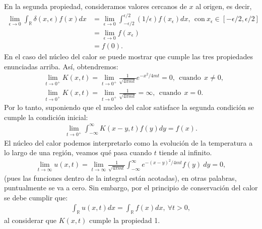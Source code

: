 \documentclass[12pt]{article}
\theoremstyle{definition}
\newcommand*{\field}[1]{\mathbb{#1}}
\begin{document}
\noindent
En la segunda propiedad, consideramos valores cercanos de $x$ al origen, es decir, 
\begin{align*}
    \lim_{\epsilon\to 0}\int_{\field{R}}\delta(x,\epsilon)f(x)dx & = \lim_{\epsilon\to 0} \int_{-\epsilon/2}^{\epsilon/2}(1/\epsilon)f(x_{\epsilon})dx, \:\:\text{con}\: x_{\epsilon} \in[-\epsilon/2,\epsilon/2]
    \\
    & =
    \lim_{\epsilon\to 0} f(x_{\epsilon})
    \\
    & =
    f(0).
\end{align*}
En el caso del núcleo del calor se puede mostrar que cumple las tres propiedades enunciadas arriba. Así, obtendremos:
\begin{align*}
    &\lim_{t\to 0^{+}} K(x,t) = 
    \lim_{t\to 0^{+}}
    \frac{1}{\sqrt{4\pi mt}}e^{-x^2/4mt} = 0, \:\: \text{cuando}\:\: x \neq 0,
    \\
    &\lim_{t\to 0^{+}} K(x,t) = \lim_{t\to 0^{+}}
    \frac{1}{\sqrt{4\pi mt}} = \infty, \:\: \text{cuando}\:\: x = 0.
\end{align*}
Por lo tanto, suponiendo que el nucleo del calor satisface la segunda condición se cumple la condición inicial:
\begin{align*}
    \lim_{t\to 0^{+}} \int_{-\infty}^{\infty}K(x-y,t)f(y)dy = f(x).
\end{align*}
El núcleo del calor podemos interpretarlo como la evolución de la temperatura a lo largo de una región, veamos qué pasa cuando $t$ tiende al infinito.
\begin{align*}
    \lim_{t\to \infty} u(x,t) =
    \lim_{t\to \infty} \frac{1}{\sqrt{4\pi mt}}\int_{-\infty}^{\infty}e^{-(x-y)^2/4mt}f(y)\:dy = 0,
\end{align*}
(pues las funciones dentro de la integral están acotadas), 
en otras palabras, puntualmente se va a cero. Sin embargo, por el principio de conservación del calor se debe cumplir que:
\begin{align*}
    \int_{\field{R}}u(x,t)dx = \int_{\field{R}}f(x) dx, \:\forall t>0,
\end{align*}
al considerar que $K(x,t)$ cumple la propiedad 1.
\newpage
\end{document}
